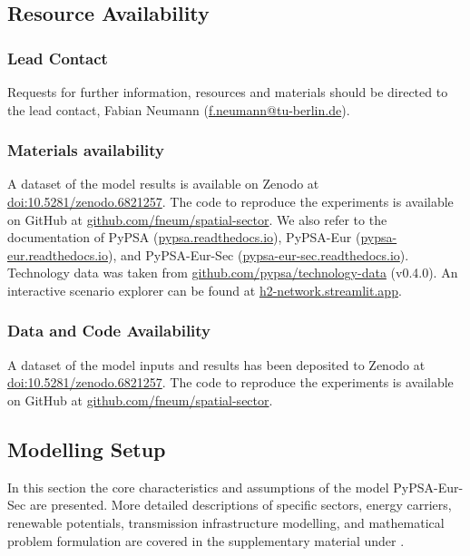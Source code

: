 \subsection*{Resource Availability}

\subsubsection*{Lead Contact}

Requests for further information, resources and materials should be directed to
the lead contact, Fabian Neumann
(\href{mailto:f.neumann@tu-berlin.de}{f.neumann@tu-berlin.de}).

\subsubsection*{Materials availability}

A dataset of the model results is available on Zenodo at
\href{https://doi.org/10.5281/zenodo.6821257}{doi:10.5281/zenodo.6821257}. The
code to reproduce the experiments is available on GitHub at
\href{https://github.com/fneum/spatial-sector}{github.com/fneum/spatial-sector}.
We also refer to the documentation of PyPSA
(\href{https://pypsa.readthedocs.io}{pypsa.readthedocs.io}), PyPSA-Eur
(\href{https://pypsa-eur.readthedocs.io}{pypsa-eur.readthedocs.io}), and
PyPSA-Eur-Sec
(\href{https://pypsa-eur-sec.readthedocs.io}{pypsa-eur-sec.readthedocs.io}).
Technology data was taken from
\href{https://github.com/pypsa/technology-data}{github.com/pypsa/technology-data}
(v0.4.0). An interactive scenario explorer can be found at
\href{https://h2-network.streamlit.app}{h2-network.streamlit.app}.

\subsubsection*{Data and Code Availability}

A dataset of the model inputs and results has been deposited to Zenodo at
\href{https://doi.org/10.5281/zenodo.6821257}{doi:10.5281/zenodo.6821257}. The
code to reproduce the experiments is available on GitHub at
\href{https://github.com/fneum/spatial-sector}{github.com/fneum/spatial-sector}.

\subsection*{Modelling Setup}

In this section the core characteristics and assumptions of the model
PyPSA-Eur-Sec are presented. More detailed descriptions of specific sectors,
energy carriers, renewable potentials, transmission infrastructure modelling,
and mathematical problem formulation are covered in the supplementary material
under .

